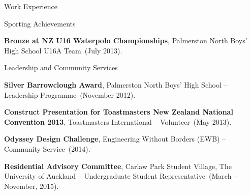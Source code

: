 \documentclass[11pt]{tracv}
\begin{document}
\begin{columnsection}{Work Experience}

	

\end{columnsection}

%
%

\pagebreak

\begin{hangingsection}{Sporting Achievements}

		\hangingentry \textbf{Bronze at NZ U16 Waterpolo Championships}, Palmerston North Boys' High School U16A Team~(July 2013).

\end{hangingsection}

\begin{hangingsection}{Leadership and Community Services}

    \hangingentry \textbf{Silver Barrowclough Award}, Palmerston North Boys' High School -- Leadership Programme~(November 2012).

    \hangingentry \textbf{Construct Presentation for Toastmasters New Zealand National Convention 2013}, Toastmasters International -- Volunteer~(May 2013).

    \hangingentry \textbf{Odyssey Design Challenge}, Engineering Without Borders (EWB) -- Community Service~(2014).

    \hangingentry \textbf{Residential Advisory Committee}, Carlaw Park Student Village, The University of Auckland -- Undergraduate Student Representative~(March -- November, 2015).

\end{hangingsection}
\end{document}
